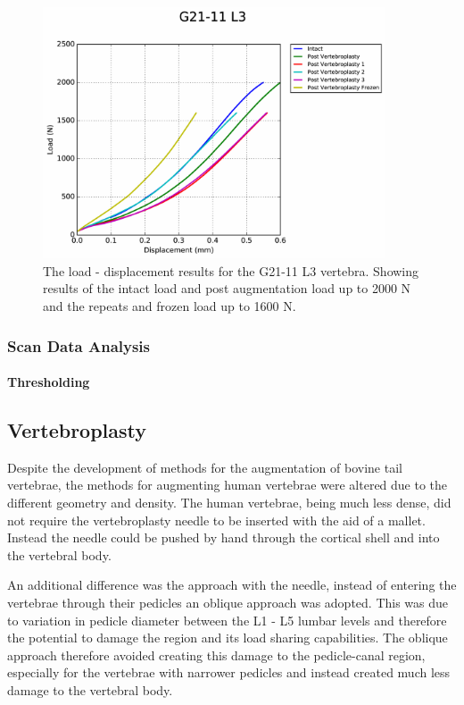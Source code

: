 \begin{figure}[ht]
\centering
\includegraphics[width=4in]{Chapters/Chapter_HT_images/G21-11_L3.pdf}
\caption{The load - displacement results for the G21-11 L3 vertebra. Showing results of the intact load and post augmentation load up to 2000 N and the repeats and frozen load up to 1600 N.}
\label{fig:G21-11_L3}
\end{figure}



\subsubsection{Scan Data Analysis}

\paragraph{Thresholding}


\subsection{Vertebroplasty}

Despite the development of methods for the augmentation of bovine tail vertebrae, the methods for augmenting human vertebrae were altered due to the different geometry and density.
The human vertebrae, being much less dense, did not require the vertebroplasty needle to be inserted with the aid of a mallet.
Instead the needle could be pushed by hand through the cortical shell and into the vertebral body.

An additional difference was the approach with the needle, instead of entering the vertebrae through their pedicles an oblique approach was adopted.
This was due to variation in pedicle diameter between the L1 - L5 lumbar levels and therefore the potential to damage the region and its load sharing capabilities.
The oblique approach therefore avoided creating this damage to the pedicle-canal region, especially for the vertebrae with narrower pedicles and instead created much less damage to the vertebral body.

